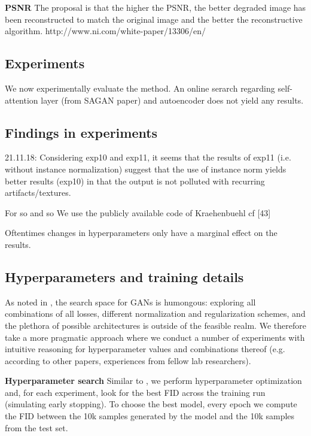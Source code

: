 \documentclass[12pt,a4paper]{article}
\begin{document}
\par \textbf{PSNR} The proposal is that the higher the PSNR, the better degraded image has been reconstructed to match the original image and the better the reconstructive algorithm.
http://www.ni.com/white-paper/13306/en/
    
\subsection{Experiments}
We now experimentally evaluate the method. An online serarch regarding self-attention layer (from SAGAN paper) and autoencoder does not yield any results.

\subsection{Findings in experiments}
21.11.18: Considering exp10 and exp11, it seems that the results of exp11 (i.e. without instance normalization) suggest that the use of instance norm yields better results (exp10) in that the output is not polluted with recurring artifacts/textures.

\par For so and so We use the publicly available code of Kraehenbuehl cf [43]

\par Oftentimes changes in hyperparameters only have a marginal effect on the results.

\subsection{Hyperparameters and training details}
As noted in \cite{1807.04720}, the search space for GANs is humongous: exploring all combinations of all losses, different normalization and regularization schemes, and the plethora of possible architectures is outside of the feasible realm. We therefore take a more pragmatic approach where we conduct a number of experiments with intuitive reasoning for hyperparameter values and combinations thereof (e.g. according to other papers, experiences from fellow lab researchers).

\textbf{Hyperparameter search} Similar to \cite{1711.10337}, we perform hyperparameter optimization and, for each experiment, look for the best FID across the training run (simulating early stopping). To choose the best model, every
epoch we compute the FID between the 10k samples generated by the model and the 10k samples from the test set.
\end{document}
